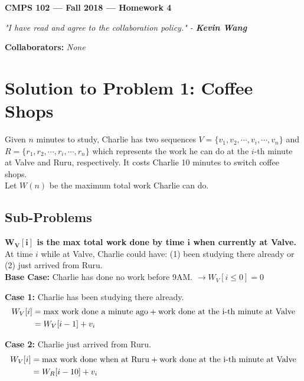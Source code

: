 \documentclass[11pt]{article}
\theoremstyle{definition}
\theoremstyle{plain}
\theoremstyle{indented-remark}
\theoremstyle{indented-proof}
\begin{document}
\begin{center}
{\bf\Large CMPS 102 --- Fall 2018 ---  Homework 4}
\end{center}

\begin{center}
\textit{"I have read and agree to the collaboration policy." - \textbf{Kevin Wang}}
\end{center}
\begin{center}
{\footnotesize \textbf{Collaborators:} \textit{None}} 
\end{center}

\section*{Solution to Problem 1: Coffee Shops}

Given $n$ minutes to study, Charlie has two sequences $V=\{ v_{1} , v_{2} , \cdots , v_{i} , \cdots , v_{n} \}$ and $R=\{ r_{1} , r_{2} , \cdots , r_{i} , \cdots , r_{n} \}$ which represents the work he can do at the $i$-th minute at Valve and Ruru, respectively. It costs Charlie 10 minutes to switch coffee shops. \\

\noindent Let $W(n)$ be the maximum total work Charlie can do.

\subsection*{Sub-Problems}

\textbf{$\boldsymbol{W_{V}[i]}$ is the max total work done by time $\boldsymbol{i}$ when currently at Valve.} At time $i$ while at Valve, Charlie could have: (1) been studying there already or (2) just arrived from Ruru. \\

\indent \textbf{Base Case:} Charlie has done no work before 9AM. $\longrightarrow W_{V}[i \leq 0]=0$ 


\indent \textbf{Case 1:} Charlie has been studying there already.
\begin{align}
W_{V}[i] &= \text{max work done a minute ago} + \text{work done at the i-th minute at Valve} \notag \\
&= W_{V}[i-1]+v_{i} \notag
\end{align}

\indent \textbf{Case 2:} Charlie just arrived from Ruru.
\begin{align}
W_{V}[i] &= \text{max work done when at Ruru} + \text{work done at the i-th minute at Valve} \notag \\
&= W_{R}[i-10]+v_{i} \notag
\end{align}
\end{document}
